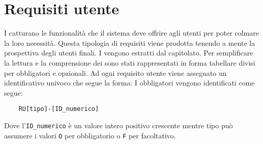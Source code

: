 \section{Requisiti utente}
\label{sec:requisiti_utente}
I  catturano le funzionalità che il sistema deve offrire agli utenti per poter colmare la loro necessità.
Questa tipologia di requisiti viene prodotta tenendo a mente la prospettiva degli utenti finali.
I  vengono estratti dal capitolato.
Per semplificare la lettura e la comprensione dei  sono stati rappresentati in forma tabellare divisi per  obbligatori e  opzionali.
Ad ogni requisito utente viene assegnato un identificativo univoco che segue la forma:
I  obbligatori vengono identificati come segue:
\begin{lstlisting}
    RU[tipo]-[ID_numerico]
\end{lstlisting}
Dove l'\lstinline{ID_numerico} è un valore intero positivo crescente mentre tipo può assumere i valori \lstinline{O} per obbligatorio o \lstinline{F} per facoltativo.



